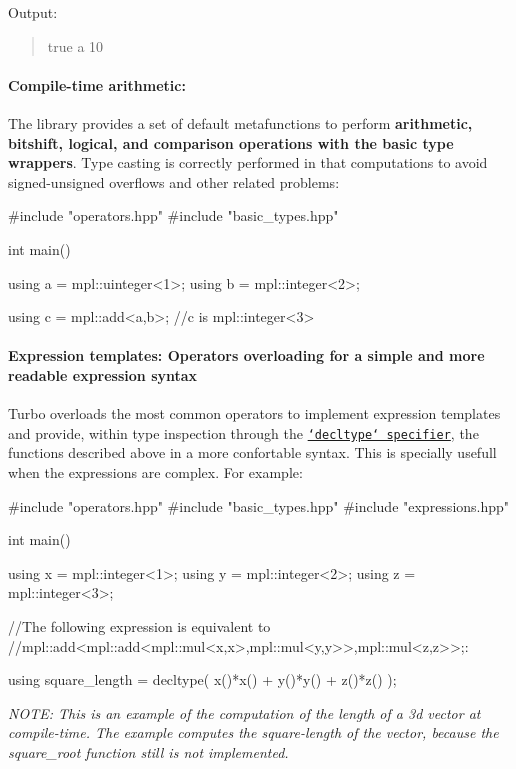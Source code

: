Output\+: \begin{quote}
true a 10 \end{quote}


\paragraph*{Compile-\/time arithmetic\+:}

The library provides a set of default metafunctions to perform {\bfseries arithmetic, bitshift, logical, and comparison operations with the basic type wrappers}. Type casting is correctly performed in that computations to avoid signed-\/unsigned overflows and other related problems\+: \begin{DoxyVerb}#include "operators.hpp"
#include "basic_types.hpp"

int main()
{
  using a = mpl::uinteger<1>;
  using b = mpl::integer<2>;

  using c = mpl::add<a,b>; //c is mpl::integer<3>
}
\end{DoxyVerb}


\paragraph*{Expression templates\+: Operators overloading for a simple and more readable expression syntax}

Turbo overloads the most common operators to implement expression templates and provide, within type inspection through the \href{http://en.cppreference.com/w/cpp/language/decltype}{\tt `decltype` specifier}, the functions described above in a more confortable syntax. This is specially usefull when the expressions are complex. For example\+: \begin{DoxyVerb}#include "operators.hpp"
#include "basic_types.hpp"
#include "expressions.hpp"

int main()
{
  using x = mpl::integer<1>;
  using y = mpl::integer<2>;
  using z = mpl::integer<3>;

  //The following expression is equivalent to
  //mpl::add<mpl::add<mpl::mul<x,x>,mpl::mul<y,y>>,mpl::mul<z,z>>;:

  using square_length = decltype( x()*x() + y()*y() + z()*z() );
}
\end{DoxyVerb}


{\itshape N\+O\+T\+E\+: This is an example of the computation of the length of a 3d vector at compile-\/time. The example computes the square-\/length of the vector, because the {\ttfamily square\+\_\+root} function still is not implemented.}

